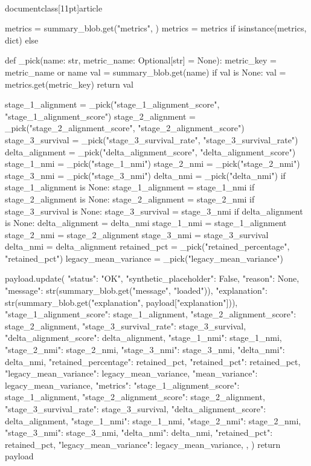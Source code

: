 \\documentclass[11pt]{article}
\begin{document}
\begin{CodeBlock}
    metrics = summary_blob.get("metrics", {})
    metrics = metrics if isinstance(metrics, dict) else {}

    def _pick(name: str, metric_name: Optional[str] = None):
        metric_key = metric_name or name
        val = summary_blob.get(name)
        if val is None:
            val = metrics.get(metric_key)
        return val

    stage_1_alignment = _pick("stage_1_alignment_score", "stage_1_alignment_score")
    stage_2_alignment = _pick("stage_2_alignment_score", "stage_2_alignment_score")
    stage_3_survival = _pick("stage_3_survival_rate", "stage_3_survival_rate")
    delta_alignment = _pick("delta_alignment_score", "delta_alignment_score")
    stage_1_nmi = _pick("stage_1_nmi")
    stage_2_nmi = _pick("stage_2_nmi")
    stage_3_nmi = _pick("stage_3_nmi")
    delta_nmi = _pick("delta_nmi")
    if stage_1_alignment is None:
        stage_1_alignment = stage_1_nmi
    if stage_2_alignment is None:
        stage_2_alignment = stage_2_nmi
    if stage_3_survival is None:
        stage_3_survival = stage_3_nmi
    if delta_alignment is None:
        delta_alignment = delta_nmi
    stage_1_nmi = stage_1_alignment
    stage_2_nmi = stage_2_alignment
    stage_3_nmi = stage_3_survival
    delta_nmi = delta_alignment
    retained_pct = _pick("retained_percentage", "retained_pct")
    legacy_mean_variance = _pick("legacy_mean_variance")

    payload.update(
        {
            "status": "OK",
            "synthetic_placeholder": False,
            "reason": None,
            "message": str(summary_blob.get("message", "loaded")),
            "explanation": str(summary_blob.get("explanation", payload["explanation"])),
            "stage_1_alignment_score": stage_1_alignment,
            "stage_2_alignment_score": stage_2_alignment,
            "stage_3_survival_rate": stage_3_survival,
            "delta_alignment_score": delta_alignment,
            "stage_1_nmi": stage_1_nmi,
            "stage_2_nmi": stage_2_nmi,
            "stage_3_nmi": stage_3_nmi,
            "delta_nmi": delta_nmi,
            "retained_percentage": retained_pct,
            "retained_pct": retained_pct,
            "legacy_mean_variance": legacy_mean_variance,
            "mean_variance": legacy_mean_variance,
            "metrics": {
                "stage_1_alignment_score": stage_1_alignment,
                "stage_2_alignment_score": stage_2_alignment,
                "stage_3_survival_rate": stage_3_survival,
                "delta_alignment_score": delta_alignment,
                "stage_1_nmi": stage_1_nmi,
                "stage_2_nmi": stage_2_nmi,
                "stage_3_nmi": stage_3_nmi,
                "delta_nmi": delta_nmi,
                "retained_pct": retained_pct,
                "legacy_mean_variance": legacy_mean_variance,
            },
        }
    )
    return payload



\end{CodeBlock}
\end{document}
